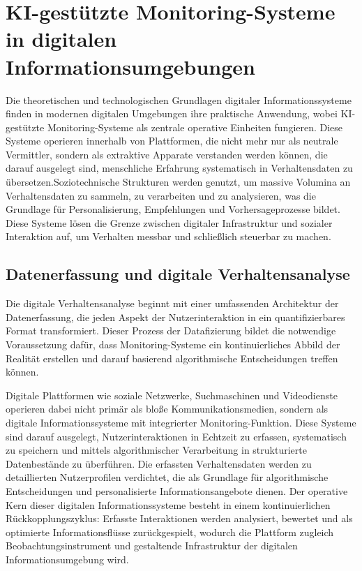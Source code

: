 \chapter{KI-gestützte Monitoring-Systeme in digitalen Informationsumgebungen}

Die theoretischen und technologischen Grundlagen digitaler Informationssysteme finden in modernen digitalen Umgebungen ihre praktische Anwendung, wobei \ac{KI}-gestützte Monitoring-Systeme als zentrale operative Einheiten fungieren. Diese Systeme operieren innerhalb von Plattformen, die nicht mehr nur als neutrale Vermittler, sondern als extraktive Apparate verstanden werden können, die darauf ausgelegt sind, menschliche Erfahrung systematisch in Verhaltensdaten zu übersetzen.Soziotechnische Strukturen werden genutzt, um massive Volumina an Verhaltensdaten zu sammeln, zu verarbeiten und zu analysieren, was die Grundlage für Personalisierung, Empfehlungen und Vorhersageprozesse bildet. Diese Systeme lösen die Grenze zwischen digitaler Infrastruktur und sozialer Interaktion auf, um Verhalten messbar und schließlich steuerbar zu machen.

\section{Datenerfassung und digitale Verhaltensanalyse}

Die digitale Verhaltensanalyse beginnt mit einer umfassenden Architektur der Datenerfassung, die jeden Aspekt der Nutzerinteraktion in ein quantifizierbares Format transformiert. Dieser Prozess der Datafizierung bildet die notwendige Voraussetzung dafür, dass Monitoring-Systeme ein kontinuierliches Abbild der Realität erstellen und darauf basierend algorithmische Entscheidungen treffen können.

Digitale Plattformen wie soziale Netzwerke, Suchmaschinen und Videodienste operieren dabei nicht primär als bloße Kommunikationsmedien, sondern als digitale Informationssysteme mit integrierter Monitoring-Funktion. Diese Systeme sind darauf ausgelegt, Nutzerinteraktionen in Echtzeit zu erfassen, systematisch zu speichern und mittels algorithmischer Verarbeitung in strukturierte Datenbestände zu überführen. Die erfassten Verhaltensdaten werden zu detaillierten Nutzerprofilen verdichtet, die als Grundlage für algorithmische Entscheidungen und personalisierte Informationsangebote dienen. Der operative Kern dieser digitalen Informationssysteme besteht in einem kontinuierlichen Rückkopplungszyklus: Erfasste Interaktionen werden analysiert, bewertet und als optimierte Informationsflüsse zurückgespielt, wodurch die Plattform zugleich Beobachtungsinstrument und gestaltende Infrastruktur der digitalen Informationsumgebung wird.

